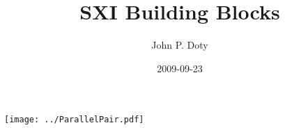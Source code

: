 \documentclass[a4paper,10pt]{report}
\author{John P. Doty}
\date{2009-09-23}
\title{SXI Building Blocks}
\begin{document}
\begin{titlepage}
\maketitle
\end{titlepage} 

\begin{center}
\texttt{[image: ../ParallelPair.pdf]}
\end{center}
\end{document}
